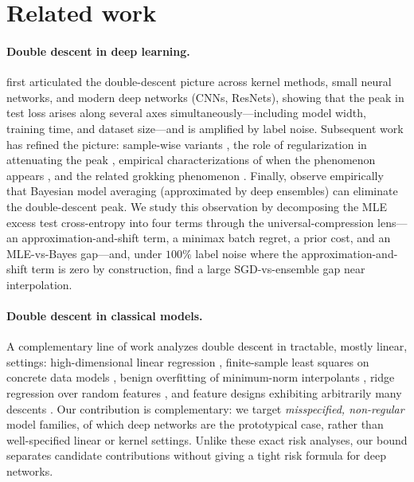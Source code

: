 
\section{Related work}
\label{sec:related}

\paragraph{Double descent in deep learning.}
\citet{belkin2019reconciling,nakkiran2021deep} first articulated the
double-descent picture across kernel methods, small neural networks, and
modern deep networks (CNNs, ResNets), showing that the peak in test loss
arises along several axes simultaneously---including model width, training
time, and dataset size---and is amplified by label noise. Subsequent work has refined the picture: sample-wise variants
\citep{nakkiran2020optimal}, the role of regularization in attenuating the
peak \citep{nakkiran2021optimal}, empirical characterizations of when the
phenomenon appears \citep{schaeffer2023double}, and the related grokking
phenomenon \citep{power2022grokking}.
Finally, \citet{wilson2020bayesian} observe empirically that Bayesian
model averaging (approximated by deep ensembles) can eliminate the
double-descent peak. We study this observation by decomposing the MLE
excess test cross-entropy into four terms through the universal-compression
lens---an approximation-and-shift term, a minimax batch regret, a prior cost,
and an MLE-vs-Bayes gap---and, under $100\%$ label noise where the
approximation-and-shift term is zero by construction, find a large
SGD-vs-ensemble gap near interpolation.

\paragraph{Double descent in classical models.}
A complementary line of work analyzes double descent in tractable, mostly
linear, settings: high-dimensional linear regression
\citep{advani2017high,hastie2022surprises}, finite-sample least squares on
concrete data models \citep{belkin2020two}, benign overfitting of
minimum-norm interpolants \citep{bartlett2020benign,muthukumar2020harmless},
ridge regression over random features \citep{mei2022generalization}, and
feature designs exhibiting arbitrarily many descents \citep{chen2021multiple}.
Our contribution is complementary: we target \emph{misspecified, non-regular}
model families, of which deep networks are the prototypical case, rather
than well-specified linear or kernel settings. Unlike these exact risk
analyses, our bound separates candidate contributions without giving a
tight risk formula for deep networks.

